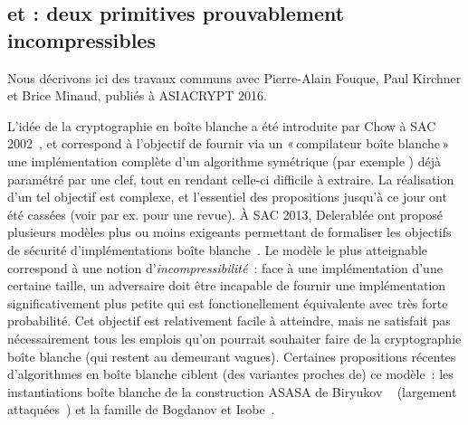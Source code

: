 \subsection{\pc et \cdb : deux primitives prouvablement incompressibles \cite{puppycipher}}

Nous décrivons ici des travaux communs avec Pierre-Alain Fouque, Paul Kirchner et Brice Minaud, publiés à ASIACRYPT 2016.

\medskip

L'idée de la cryptographie en boîte blanche a été introduite par Chow \etal à SAC 2002~\cite{DBLP:conf/sacrypt/ChowEJO02},
et correspond à l'objectif de fournir via un «\,compilateur boîte blanche\,» une implémentation complète d'un algorithme symétrique (par exemple \aes) déjà paramétré par
une clef, tout en rendant celle-ci difficile à extraire. La réalisation d'un tel objectif est complexe, et l'essentiel des propositions
jusqu'à ce jour ont été cassées (voir par ex. \cite{HenriWB} pour une revue).
À SAC 2013, Delerablée \etal ont proposé plusieurs modèles plus ou moins exigeants
permettant de formaliser les objectifs de sécurité d'implémentations boîte blanche~\cite{DBLP:conf/sacrypt/DelerableeLPR13}.
Le modèle le plus atteignable correspond à une notion d'\emph{incompressibilité}~: face à une implémentation d'une certaine taille, un adversaire doit être incapable de fournir une implémentation
significativement plus petite qui est fonctionellement équivalente avec très forte probabilité. Cet objectif est relativement facile à atteindre, mais ne satisfait pas nécessairement
tous les emplois qu'on pourrait souhaiter faire de la cryptographie boîte blanche (qui restent au demeurant vagues). Certaines propositions récentes d'algorithmes en boîte blanche ciblent
(des variantes proches de) ce modèle~: les instantiations boîte blanche de la construction ASASA de Biryukov \etal~\cite{DBLP:conf/asiacrypt/BiryukovBK14}
(largement attaquées~\cite{DBLP:journals/iacr/DinurDKL15,DBLP:conf/asiacrypt/MinaudDFK15}) et la famille \spacehard de Bogdanov et Isobe~\cite{DBLP:conf/ccs/BogdanovI15}.

